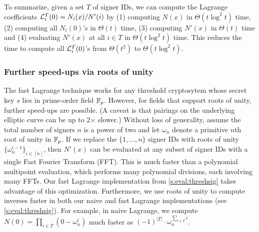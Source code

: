 To summarize, given a set $T$ of signer IDs, we can compute the Lagrange coefficients $\mathcal{L}_i^T(0) = N_i(x) / N'(i)$ by (1) computing $N(x)$ in $\Theta(t\log^2{t})$ time, (2) computing all $N_i(0)$'s in $\Theta(t)$ time, (3) computing $N'(x)$ in $\Theta(t)$ time and (4) evaluating $N'(x)$ at all $i\in T$ in $\Theta(t\log^2{t})$ time.
This reduces the time to compute all $\mathcal{L}_i^T(0)$'s from $\Theta(t^2)$ to $\Theta(t\log^2{t})$.

\subsubsection{Further speed-ups via roots of unity}
\label{s:threshsig:roots-of-unity}
The fast Lagrange technique works for any threshold cryptosytem whose secret key $s$ lies in prime-order field $\mathbb{F}_p$.
However, for fields that support roots of unity, further speed-ups are possible.
(A caveat is that pairings on the underlying elliptic curve can be up to 2$\times$ slower.)
Without loss of generality, assume the total number of signers $n$ is a power of two and let $\omega_n$ denote a primitive $n$th root of unity in $\mathbb{F}_p$.
If we replace the $\{1,\dots,n\}$ signer IDs with roots of unity $\{\omega_n^{i-1}\}_{i\in[n]}$, then $N'(x)$ can be evaluated at any subset of signer IDs with a single Fast Fourier Transform (FFT).
This is much faster than a polynomial multipoint evaluation, which performs many polynomial divisions, each involving many FFTs.
Our fast Lagrange implementation from \cref{s:eval:threshsig} takes advantage of this optimization.
Furthermore, we use roots of unity to compute inverses faster in both our naive and fast Lagrange implementations (see \cref{s:eval:threshsig}).
For example, in naive Lagrange, we compute $N(0)=\prod_{i\in T}(0-\omega_n^i)$ much faster as $(-1)^{|T|}\cdot \omega_n^{\sum_{i\in T} i}$.
